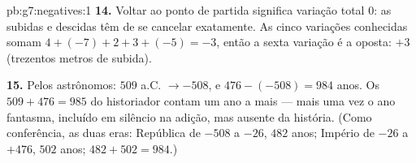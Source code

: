 \begin{solution}{pb:g7:negatives:1}
\textbf{14.} Voltar ao ponto de partida significa variação total $0$:
as subidas e descidas têm de se cancelar exatamente. As cinco variações
conhecidas somam $4 + (-7) + 2 + 3 + (-5) = -3$, então a sexta variação
é a oposta: $+3$ (trezentos metros de subida).

\textbf{15.} Pelos astrônomos: $509$ a.C. $\to -508$, e
$476 - (-508) = 984$ anos. Os $509 + 476 = 985$ do historiador contam
um ano a mais --- mais uma vez o ano  fantasma, incluído em
silêncio na adição, mas ausente da história. (Como conferência, as duas
eras: República de $-508$ a $-26$, $482$ anos; Império de $-26$ a
$+476$, $502$ anos; $482 + 502 = 984$.)
\end{solution}
